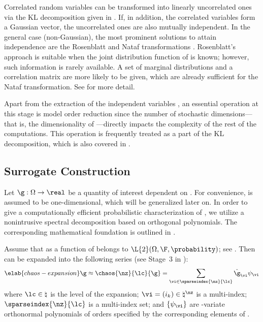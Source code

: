 Correlated random variables can be transformed into linearly uncorrelated ones
via the \ac{KL} decomposition given in . If, in addition,
the correlated variables form a Gaussian vector, the uncorrelated ones are also
mutually independent. In the general case (non-Gaussian), the most prominent
solutions to attain independence are the Rosenblatt \cite{rosenblatt1952} and
Nataf transformations \cite{liu1986}. Rosenblatt's approach is suitable when the
joint distribution function of \vu is known; however, such information is rarely
available. A set of marginal distributions and a correlation matrix are more
likely to be given, which are already sufficient for the Nataf transformation.
See  for more detail.

Apart from the extraction of the independent variables \vz, an essential
operation at this stage is model order reduction since the number of stochastic
dimensions---that is, the dimensionality of \vz---directly impacts the
complexity of the rest of the computations. This operation is frequently treated
as a part of the \ac{KL} decomposition, which is also covered in
.

\subsection{Surrogate Construction}

Let $\g: \Omega \to \real$ be a quantity of interest dependent on \vu. For
convenience, \g is assumed to be one-dimensional, which will be generalized
later on. In order to give a computationally efficient probabilistic
characterization of \g, we utilize a nonintrusive spectral decomposition based
on orthogonal polynomials. The corresponding mathematical foundation is outlined
in .

Assume that \g as a function of \vu belongs to $\L{2}(\Omega, \F,
\probability)$; see . Then \g can be expanded into the
following series (see Stage~3 in ):
\begin{equation} \elab{chaos-expansion}
  \g \approx \chaos{\nz}{\lc}{\g} = \sum_{\vi \in \sparseindex{\nz}{\lc}} \hat{\g}_{\vi} \psi_{\vi}
\end{equation}
where $\lc \in \natural$ is the level of the expansion; $\vi = (i_k) \in
\natural^\nz$ is a multi-index; $\sparseindex{\nz}{\lc}$ is a multi-index set;
and $\{ \psi_{\vi} \}$ are \nz-variate orthonormal polynomials of orders
specified by the corresponding elements of \vi.

